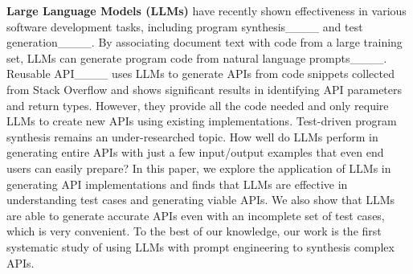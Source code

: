 \textbf{Large Language Models (LLMs)} have recently shown effectiveness in various software development tasks, including program synthesis____ and test generation____. By associating document text with code from a large training set, LLMs can generate program code from natural language prompts____. Reusable API____ uses LLMs to generate APIs from code snippets collected from Stack Overflow and shows significant results in identifying API parameters and return types. However, they provide all the code needed and only require LLMs to create new APIs using existing implementations. Test-driven program synthesis remains an under-researched topic. How well do LLMs perform in generating entire APIs with just a few input/output examples that even end users can easily prepare? In this paper, we explore the application of LLMs in generating API implementations and finds that LLMs are effective in understanding test cases and generating viable APIs. We also show that LLMs are able to generate accurate APIs even with an incomplete set of test cases, which is very convenient. To the best of our knowledge, our work is the first systematic study of using LLMs with prompt engineering to synthesis complex APIs.

%